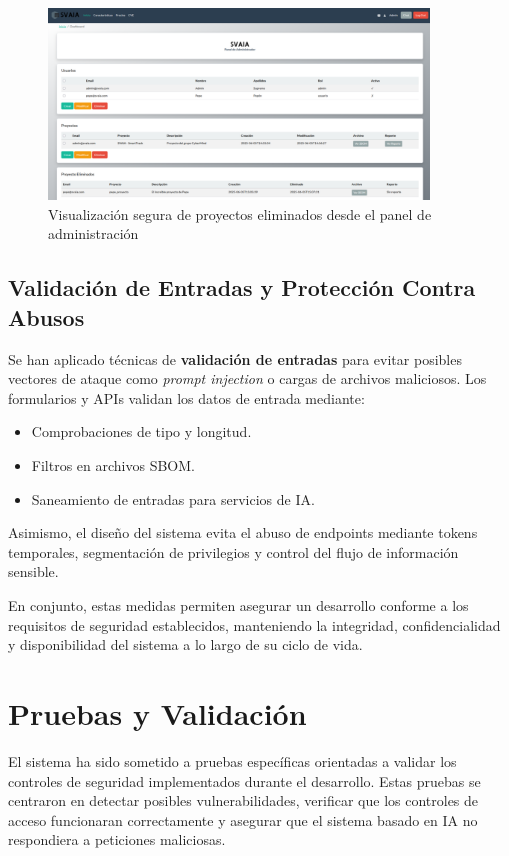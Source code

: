 \documentclass[11pt]{article}
\begin{document}
\begin{figure}[H]
    \centering
    \includegraphics[width=0.9\textwidth]{images/svaia_admin_panel.png}
    \caption{Visualización segura de proyectos eliminados desde el panel de administración}
\end{figure}

\subsection{Validación de Entradas y Protección Contra Abusos}

Se han aplicado técnicas de \textbf{validación de entradas} para evitar posibles vectores de ataque como \textit{prompt injection} o cargas de archivos maliciosos. Los formularios y APIs validan los datos de entrada mediante:

\begin{itemize}
    \item Comprobaciones de tipo y longitud.
    \item Filtros en archivos SBOM.
    \item Saneamiento de entradas para servicios de IA.
\end{itemize}

Asimismo, el diseño del sistema evita el abuso de endpoints mediante tokens temporales, segmentación de privilegios y control del flujo de información sensible.

En conjunto, estas medidas permiten asegurar un desarrollo conforme a los requisitos de seguridad establecidos, manteniendo la integridad, confidencialidad y disponibilidad del sistema a lo largo de su ciclo de vida.

\section{Pruebas y Validación}

El sistema ha sido sometido a pruebas específicas orientadas a validar los controles de seguridad implementados durante el desarrollo. Estas pruebas se centraron en detectar posibles vulnerabilidades, verificar que los controles de acceso funcionaran correctamente y asegurar que el sistema basado en IA no respondiera a peticiones maliciosas.
\end{document}
